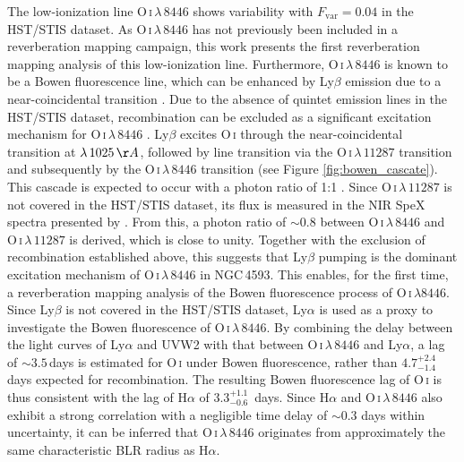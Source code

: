 The low-ionization line O\,\textsc{i}\,$\lambda\,8446$ shows variability with $F_\mathrm{var} = 0.04$ in the HST/STIS dataset. As O\,\textsc{i}\,$\lambda\,8446$ has not previously been included in a reverberation mapping campaign, this work presents the first reverberation mapping analysis of this low-ionization line. Furthermore, O\,\textsc{i}\,$\lambda\,8446$ is known to be a Bowen fluorescence line, which can be enhanced by Ly$\beta$ emission due to a near-coincidental transition \parencite{grandi1980}. Due to the absence of quintet emission lines in the HST/STIS dataset, recombination can be excluded as a significant excitation mechanism for O\,\textsc{i}\,$\lambda\,8446$ \parencite{grandi1980}. Ly$\beta$ excites O\,\textsc{i} through the near-coincidental transition at $\lambda\,1025\,\AA$, followed by line transition via the O\,\textsc{i}\,$\lambda\,11287$ transition and subsequently by the O\,\textsc{i}\,$\lambda\,8446$ transition (see Figure \ref{fig:bowen_cascate}). This cascade is expected to occur with a photon ratio of 1:1 \parencite{grandi1980}. Since O\,\textsc{i}\,$\lambda\,11287$ is not covered in the HST/STIS dataset, its flux is measured in the NIR SpeX spectra presented by \cite{landt2008near}. From this, a photon ratio of $\sim 0.8$ between O\,\textsc{i}\,$\lambda\,8446$ and O\,\textsc{i}\,$\lambda\,11287$ is derived, which is close to unity. Together with the exclusion of recombination established above, this suggests that Ly$\beta$ pumping is the dominant excitation mechanism of O\,\textsc{i}\,$\lambda\,8446$ in NGC\,4593. This enables, for the first time, a reverberation mapping analysis of the Bowen fluorescence process of O\,\textsc{i}$\,\lambda 8446$. Since Ly$\beta$ is not covered in the HST/STIS dataset, Ly$\alpha$ is used as a proxy to investigate the Bowen fluorescence of O\,\textsc{i}\,$\lambda\,8446$. By combining the delay between the light curves of Ly$\alpha$ and UVW2 with that between O\,\textsc{i}\,$\lambda\,8446$ and Ly$\alpha$, a lag of $\sim 3.5\,$days is estimated for O\,\textsc{i} under Bowen fluorescence, rather than $4.7^{+2.4}_{-1.4}\,$days expected for recombination. The resulting Bowen fluorescence lag of O\,\textsc{i} is thus consistent with the lag of H$\alpha$ of $3.3 \ensuremath{_{-0.6}^{+1.1}}\,$ days. Since H$\alpha$ and O\,\textsc{i}\,$\lambda\,8446$ also exhibit a strong correlation with a negligible time delay of $\sim 0.3$ days within uncertainty, it can be inferred that O\,\textsc{i}\,$\lambda\,8446$ originates from approximately the same characteristic BLR radius as H$\alpha$.


